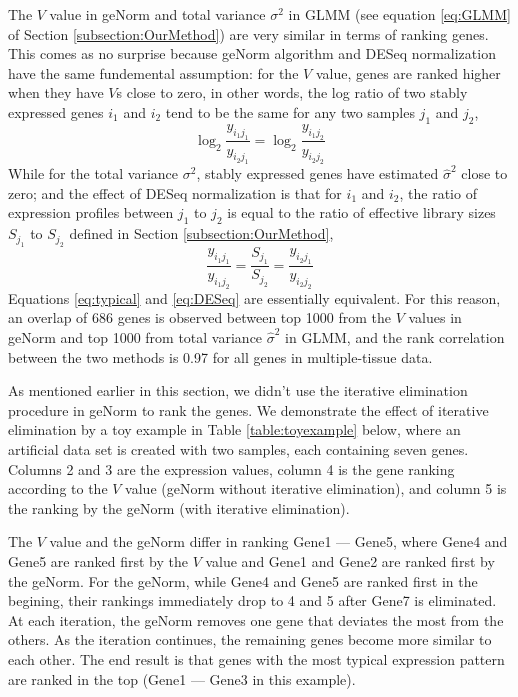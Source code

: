 \documentclass[11pt, a4paper]{article}
\begin{document}
The $V$ value in geNorm \citep{vandesompele2002accurate} and total variance $\sigma^2$ in GLMM (see equation \ref{eq:GLMM} of Section \ref{subsection:OurMethod}) are very similar in terms of ranking genes. This comes as no surprise because geNorm algorithm \citep{vandesompele2002accurate} and DESeq normalization \citep{anders2010differential}
have the same fundemental assumption: for the $V$ value, genes are ranked higher when they have $V$s close to zero, in other words, the log ratio of two stably expressed genes $i_1$ and $i_2$  tend to be the same for any two samples $j_1$ and $j_2$,
 \begin{equation}\label{eq:typical}
    \log_2\frac{y_{i_1j_1}}{y_{i_2j_1}} = \log_2\frac{y_{i_1j_2}}{y_{i_2j_2}}
\end{equation} 
While for the total variance $\sigma^2$, stably expressed genes have estimated $\hat\sigma^2$ close to zero; and the effect of DESeq normalization is that for $i_1$ and $i_2$, the ratio of expression profiles between $j_1$ to $j_2$ is equal to the ratio of effective library sizes $S_{j_1}$ to $S_{j_2}$ defined in Section \ref{subsection:OurMethod},
\begin{equation}\label{eq:DESeq} \frac{y_{i_1j_1}}{y_{i_1j_2}} =
    \frac{S_{j_1}}{S_{j_2}}=\frac{y_{i_2j_1}}{y_{i_2j_2}} \end{equation}
 Equations \ref{eq:typical} and \ref{eq:DESeq} are essentially equivalent. For
 this reason, an overlap of 686 genes is observed between top 1000 from the $V$ values in geNorm and top 1000 from total variance $\hat{\sigma}^2$ in GLMM, and the rank correlation between the two methods is 0.97 for all genes in multiple-tissue data. 

As mentioned earlier in this section, we didn't use the iterative elimination procedure in geNorm to rank the genes. 
We demonstrate the effect of iterative elimination by a toy example in Table \ref{table:toyexample} below, where an artificial data set is created with two samples, each containing seven genes. Columns 2 and 3 are the expression values, column 4 is the gene ranking according to the $V$ value (geNorm without iterative elimination), and column 5 is the ranking by the geNorm (with iterative elimination). 
  
The $V$ value and the geNorm differ in ranking Gene1 --- Gene5, where Gene4 and Gene5 are ranked first by the $V$ value and Gene1 and Gene2 are ranked first by the geNorm. For the geNorm, while Gene4 and Gene5 are ranked first in the begining, their rankings immediately drop to 4 and 5 after Gene7 is eliminated. At each iteration, the geNorm removes one gene that deviates the most from the others. As the iteration continues, the remaining genes become more similar to each other. The end result is that genes with the most typical expression pattern are ranked in the top (Gene1 --- Gene3 in this example). 	  
\end{document}

